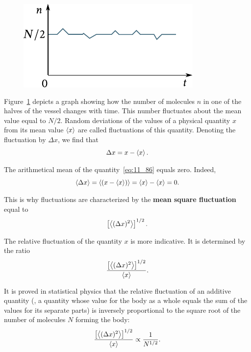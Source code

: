 \begin{figure}[t]
	\begin{center}
		\includegraphics[scale=1.0]{figures/ch_11/fig_11_25.pdf}
		\caption[]{}
		\label{fig:11_25}
	\end{center}
	\vspace{-0.8cm}
\end{figure}

Figure~\ref{fig:11_25} depicts a graph showing how the number of molecules $n$ in one of the halves of the vessel changes with time. This number fluctuates about the mean value equal to $N/2$. Random deviations of the values of a physical quantity $x$ from its mean value $\left\langle x \right\rangle$ are called fluctuations of this quantity. Denoting the fluctuation by $\Delta x$, we find that
\begin{equation}\label{eq:11_86}
	\Delta x = x - \left\langle x \right\rangle.
\end{equation}

\noindent
The arithmetical mean of the quantity~\eqref{eq:11_86} equals zero. Indeed,
\begin{equation*}
	\left\langle \Delta x \right\rangle = \left\langle (x - \left\langle x \right\rangle) \right\rangle = \left\langle x \right\rangle - \left\langle x \right\rangle = 0.
\end{equation*}

\noindent
This is why fluctuations are characterized by the \textbf{mean square fluctuation} equal to
\begin{equation}\label{eq:11_87}
	\left[\left\langle (\Delta x)^2 \right\rangle\right]^{1/2}.
\end{equation}

The relative fluctuation of the quantity $x$ is more indicative. It is determined by the ratio
\begin{equation}\label{eq:11_88}
	\frac{\left[\left\langle (\Delta x)^2 \right\rangle\right]^{1/2}}{\left\langle x \right\rangle}.
\end{equation}

It is proved in statistical physics that the relative fluctuation of an additive quantity (\ie, a quantity whose value for the body as a whole equals the sum of the values for its separate parts) is inversely proportional to the square root of the number of molecules $N$ forming the body:
\begin{equation}\label{eq:11_89}
	\frac{\left[\left\langle (\Delta x)^2 \right\rangle\right]^{1/2}}{\left\langle x \right\rangle} \propto \frac{1}{N^{1/2}}.
\end{equation}

